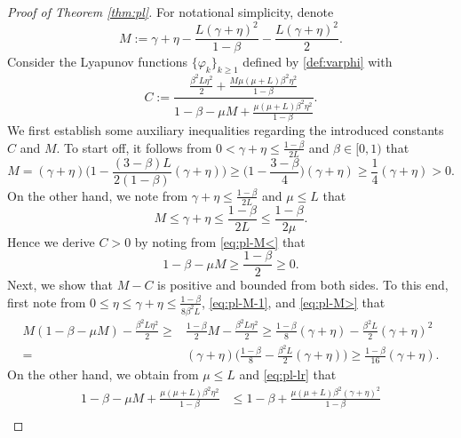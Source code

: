 \documentclass[10pt]{article}
\numberwithin{equation}{section}
\theoremstyle{definition}
\begin{document}
\begin{proof}[Proof of Theorem \ref{thm:pl}]
For notational simplicity, denote
\[
    M:=\gamma+\eta-\frac{L(\gamma+\eta)^2}{1-\beta}-\frac{L(\gamma+\eta)^2}{2}.
\]
Consider the Lyapunov functions $\{\varphi_k\}_{k\ge 1}$ defined by \eqref{def:varphi} with
\begin{equation}\label{def:C}
C:=\frac{\frac{\beta^2 L \eta^2}{2}+\frac{M \mu(\mu+L) \beta^2 \eta^2}{1-\beta}}{1-\beta-\mu M+\frac{\mu(\mu+L) \beta^2 \eta^2}{1-\beta}}.
\end{equation}
We first establish some auxiliary inequalities regarding the introduced constants $C$ and $M$. To start off, it follows from $0<\gamma+\eta \leq \frac{1-\beta}{2 L}$ and $\beta\in[0,1)$ that
\begin{equation}\label{eq:pl-M>}
    M=(\gamma+\eta)\Big(1-\frac{(3-\beta) L}{2(1-\beta)}(\gamma+\eta)\Big) \ge \Big(1-\frac{3-\beta}{4}\Big)(\gamma+\eta) \ge \frac{1}{4}(\gamma+\eta)>0.
\end{equation}
On the other hand, we note from $\gamma+\eta\leq\frac{1-\beta}{2 L}$ and $\mu\leq L$ that
\begin{equation}\label{eq:pl-M<}
    M \leq \gamma+\eta \leq \frac{1-\beta}{2 L}\leq\frac{1-\beta}{2 \mu}.
\end{equation}
Hence we derive $C>0$ by noting from \eqref{eq:pl-M<} that
\begin{equation}\label{eq:pl-M-1}
1-\beta-\mu M \ge \frac{1-\beta}{2}\ge 0.
\end{equation}
Next, we show that $M-C$ is positive and bounded from both sides. To this end, first note from $0\leq\eta\leq\gamma+\eta \leq \frac{1-\beta}{8 \beta^2 L}$, \eqref{eq:pl-M-1}, and \eqref{eq:pl-M>} that
\begin{equation}\label{eq:pl-M-C-1}
\begin{aligned}
M(1-\beta-\mu M)-\frac{\beta^2 L\eta^2}{2} \ge& \frac{1-\beta}{2} M-\frac{\beta^2 L \eta^2}{2} \ge \frac{1-\beta}{8}(\gamma+\eta)-\frac{\beta^2 L}{2}(\gamma+\eta)^2 \\
= & (\gamma+\eta)\Big(\frac{1-\beta}{8}-\frac{\beta^2 L}{2}(\gamma+\eta)\Big) \ge \frac{1-\beta}{16}(\gamma+\eta).
\end{aligned}
\end{equation}
On the other hand, we obtain from $\mu\leq L$ and \eqref{eq:pl-lr} that
\begin{equation}\label{eq:pl-M-C-2}
\begin{aligned}
1-\beta-\mu M+\frac{\mu(\mu+L) \beta^2 \eta^2}{1-\beta} & \leq 1-\beta+\frac{\mu(\mu+L) \beta^2(\gamma+\eta)^2}{1-\beta} \\

\end{aligned}
\end{equation}
\end{proof}
\end{document}
